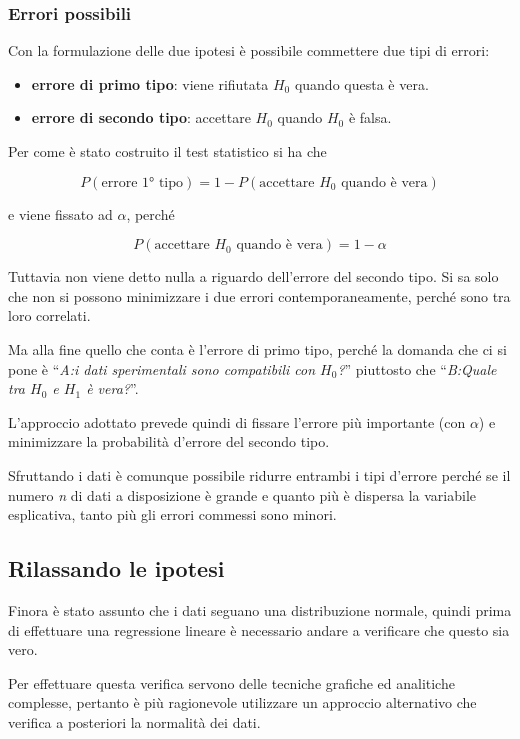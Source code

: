 \subsubsection{Errori possibili}\label{errori-possibili}

Con la formulazione delle due ipotesi è possibile commettere due tipi di
errori:

\begin{itemize}
\item
  \textbf{errore di primo tipo}: viene rifiutata $ H_0 $ quando questa è
  vera.
\item
  \textbf{errore di secondo tipo}: accettare $ H_0 $ quando $ H_0 $ è falsa.
\end{itemize}

Per come è stato costruito il test statistico si ha che

$$
P(\text{errore 1° tipo}) = 1 - P(\text{accettare } H_0 \text{ quando è vera})
$$

e viene fissato ad $\alpha$, perché

$$ P(\text{accettare } H_0 \text{ quando è vera}) = 1- \alpha $$

Tuttavia non viene detto nulla a riguardo dell'errore del secondo tipo.
Si sa solo che non si possono minimizzare i due errori
contemporaneamente, perché sono tra loro correlati.

Ma alla fine quello che conta è l'errore di primo tipo, perché la
domanda che ci si pone è ``\emph{A:i dati sperimentali sono compatibili
con $ H_0 $?}'' piuttosto che ``\emph{B:Quale tra $ H_0 $ e $ H_1 $ è vera?}''.

L'approccio adottato prevede quindi di fissare l'errore più importante
(con $\alpha$) e minimizzare la probabilità d'errore del secondo
tipo.

Sfruttando i dati è comunque possibile ridurre entrambi i tipi d'errore
perché se il numero \emph{n} di dati a disposizione è grande e quanto
più è dispersa la variabile esplicativa, tanto più gli errori commessi
sono minori.

\subsection{Rilassando le ipotesi}\label{commenti}

Finora è stato assunto che i dati seguano una distribuzione normale,
quindi prima di effettuare una regressione lineare è necessario andare a
verificare che questo sia vero.

Per effettuare questa verifica servono delle tecniche grafiche ed
analitiche complesse, pertanto è più ragionevole utilizzare un approccio
alternativo che verifica a posteriori la normalità dei dati.

